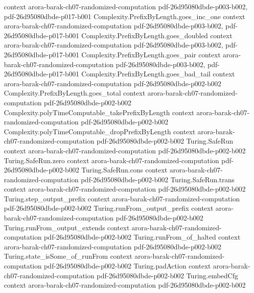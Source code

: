 \begin{theorem}
  {context}
  {arora-barak-ch07-randomized-computation}
  {pdf-26d95080dbde-p003-b002,
    pdf-26d95080dbde-p017-b001}
\proofstep
  {Complexity.PrefixByLength.goes_inc_one}
  {context}
  {arora-barak-ch07-randomized-computation}
  {pdf-26d95080dbde-p003-b002,
    pdf-26d95080dbde-p017-b001}
\proofstep
  {Complexity.PrefixByLength.goes_doubled}
  {context}
  {arora-barak-ch07-randomized-computation}
  {pdf-26d95080dbde-p003-b002,
    pdf-26d95080dbde-p017-b001}
\proofstep
  {Complexity.PrefixByLength.goes_pair}
  {context}
  {arora-barak-ch07-randomized-computation}
  {pdf-26d95080dbde-p003-b002,
    pdf-26d95080dbde-p017-b001}
\proofstep
  {Complexity.PrefixByLength.goes_bad_tail}
  {context}
  {arora-barak-ch07-randomized-computation}
  {pdf-26d95080dbde-p002-b002}
\proofstep
  {Complexity.PrefixByLength.goes_total}
  {context}
  {arora-barak-ch07-randomized-computation}
  {pdf-26d95080dbde-p002-b002}
\proofstep
  {Complexity.polyTimeComputable_takePrefixByLength}
  {context}
  {arora-barak-ch07-randomized-computation}
  {pdf-26d95080dbde-p002-b002}
\proofstep
  {Complexity.polyTimeComputable_dropPrefixByLength}
  {context}
  {arora-barak-ch07-randomized-computation}
  {pdf-26d95080dbde-p002-b002}
\proofstep
  {Turing.SafeRun}
  {context}
  {arora-barak-ch07-randomized-computation}
  {pdf-26d95080dbde-p002-b002}
\proofstep
  {Turing.SafeRun.zero}
  {context}
  {arora-barak-ch07-randomized-computation}
  {pdf-26d95080dbde-p002-b002}
\proofstep
  {Turing.SafeRun.cons}
  {context}
  {arora-barak-ch07-randomized-computation}
  {pdf-26d95080dbde-p002-b002}
\proofstep
  {Turing.SafeRun.trans}
  {context}
  {arora-barak-ch07-randomized-computation}
  {pdf-26d95080dbde-p002-b002}
\proofstep
  {Turing.step_output_prefix}
  {context}
  {arora-barak-ch07-randomized-computation}
  {pdf-26d95080dbde-p002-b002}
\proofstep
  {Turing.runFrom_output_prefix}
  {context}
  {arora-barak-ch07-randomized-computation}
  {pdf-26d95080dbde-p002-b002}
\proofstep
  {Turing.runFrom_output_extends}
  {context}
  {arora-barak-ch07-randomized-computation}
  {pdf-26d95080dbde-p002-b002}
\proofstep
  {Turing.runFrom_of_halted}
  {context}
  {arora-barak-ch07-randomized-computation}
  {pdf-26d95080dbde-p002-b002}
\proofstep
  {Turing.state_isSome_of_runFrom}
  {context}
  {arora-barak-ch07-randomized-computation}
  {pdf-26d95080dbde-p002-b002}
\proofstep
  {Turing.padAction}
  {context}
  {arora-barak-ch07-randomized-computation}
  {pdf-26d95080dbde-p002-b002}
\proofstep
  {Turing.embedCfg}
  {context}
  {arora-barak-ch07-randomized-computation}
  {pdf-26d95080dbde-p002-b002}
\proofstep

\end{theorem}
